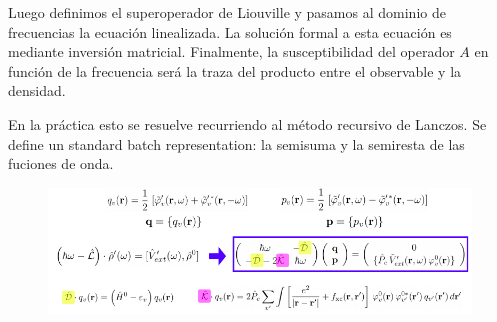   Luego definimos el superoperador de Liouville y pasamos al dominio de frecuencias la ecuación linealizada. La solución formal a esta ecuación es mediante inversión matricial. Finalmente, la susceptibilidad del operador $A$ en función de la frecuencia será la traza del producto entre el observable y la densidad.
    \begin{figure}[H]
        \centering
    \end{figure}

  En la práctica esto se resuelve recurriendo al método recursivo de Lanczos. Se define un standard batch representation: la semisuma y la semiresta de las fuciones de onda.
    \begin{figure}[H]
        \centering
        \includegraphics[scale = 0.6]{figs/D6/Liou_5.png}
    \end{figure}

